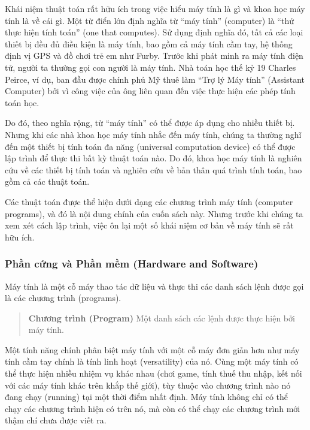 Khái niệm thuật toán rất hữu ích trong việc hiểu máy tính là gì và khoa
học máy tính là về cái gì. Một từ điển lớn định nghĩa từ ``máy tính''
(computer) là ``thứ thực hiện tính toán'' (one that computes). Sử dụng
định nghĩa đó, tất cả các loại thiết bị đều đủ điều kiện là máy tính,
bao gồm cả máy tính cầm tay, hệ thống định vị GPS và đồ chơi trẻ em như
Furby. Trước khi phát minh ra máy tính điện tử, người ta thường gọi con
người là máy tính. Nhà toán học thế kỷ 19 Charles Peirce, ví dụ, ban đầu
được chính phủ Mỹ thuê làm ``Trợ lý Máy tính'' (Assistant Computer) bởi
vì công việc của ông liên quan đến việc thực hiện các phép tính toán
học.

Do đó, theo nghĩa rộng, từ ``máy tính'' có thể được áp dụng cho nhiều
thiết bị. Nhưng khi các nhà khoa học máy tính nhắc đến máy tính, chúng
ta thường nghĩ đến một thiết bị tính toán đa năng (universal computation
device) có thể được lập trình để thực thi bất kỳ thuật toán nào. Do đó,
khoa học máy tính là nghiên cứu về các thiết bị tính toán và nghiên cứu
về bản thân quá trình tính toán, bao gồm cả các thuật toán.

Các thuật toán được thể hiện dưới dạng các chương trình máy tính
(computer programs), và đó là nội dung chính của cuốn sách này. Nhưng
trước khi chúng ta xem xét cách lập trình, việc ôn lại một số khái niệm
cơ bản về máy tính sẽ rất hữu ích.

\subsubsection{Phần cứng và Phần mềm (Hardware and
Software)}\label{phux1ea7n-cux1ee9ng-vuxe0-phux1ea7n-mux1ec1m-hardware-and-software}

Máy tính là một cỗ máy thao tác dữ liệu và thực thi các danh sách lệnh
được gọi là các chương trình (programs).

\begin{quote}
\textbf{Chương trình (Program)} Một danh sách các lệnh được thực hiện
bởi máy tính.
\end{quote}

Một tính năng chính phân biệt máy tính với một cỗ máy đơn giản hơn như
máy tính cầm tay chính là tính linh hoạt (versatility) của nó. Cùng một
máy tính có thể thực hiện nhiều nhiệm vụ khác nhau (chơi game, tính thuế
thu nhập, kết nối với các máy tính khác trên khắp thế giới), tùy thuộc
vào chương trình nào nó đang chạy (running) tại một thời điểm nhất định.
Máy tính không chỉ có thể chạy các chương trình hiện có trên nó, mà còn
có thể chạy các chương trình mới thậm chí chưa được viết ra.

